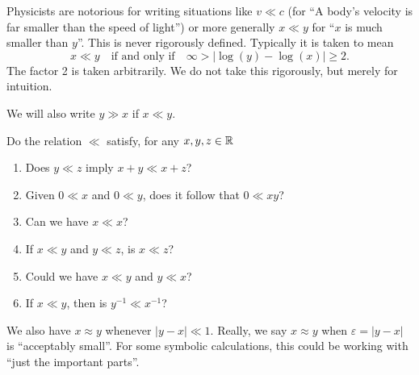 Physicists are notorious for writing situations like $v\ll c$ (for ``A
body's velocity is far smaller than the speed of light'') or more
generally $x\ll y$ for ``$x$ is much smaller than $y$''. This is never
rigorously defined. Typically it is taken to mean
\begin{equation}
x\ll y\quad\mbox{if and only if}\quad \infty>|\log(y)-\log(x)|\geq2.
\end{equation}
The factor 2 is taken arbitrarily. We do not take this rigorously, but
merely for intuition.

We will also write $y\gg x$ if $x\ll y$.

 Do the relation $\ll$ satisfy, for any $x,y,z\in\mathbb{R}$
\begin{enumerate}
\item Does $y\ll z$ imply $x+y\ll x+z$?
\item Given $0\ll x$ and $0\ll y$, does it follow that $0\ll xy$?
\item Can we have $x\ll x$?
\item If $x\ll y$ and $y\ll z$, is $x\ll z$?
\item Could we have $x\ll y$ and $y\ll x$?
\item If $x\ll y$, then is $y^{-1}\ll x^{-1}$?
\end{enumerate}

We also have $x\approx y$ whenever $|y-x|\ll1$.
Really, we say $x\approx y$ when $\varepsilon=|y-x|$ is ``acceptably
small''. For some symbolic calculations, this could be working with
``just the important parts''.
